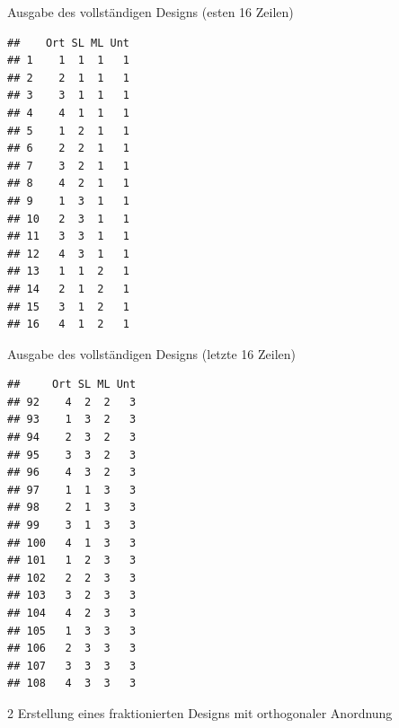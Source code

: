 \documentclass[12pt,ngerman,a4paper,ignorenonframetext,]{beamer}
\newenvironment{Shaded}{\begin{snugshade}}{\end{snugshade}}
\newcommand{\CommentTok}[1]{\textcolor[rgb]{0.56,0.35,0.01}{\textit{#1}}}
\newcommand{\DecValTok}[1]{\textcolor[rgb]{0.00,0.00,0.81}{#1}}
\newcommand{\KeywordTok}[1]{\textcolor[rgb]{0.13,0.29,0.53}{\textbf{#1}}}
\newcommand{\NormalTok}[1]{#1}
\newcommand{\OperatorTok}[1]{\textcolor[rgb]{0.81,0.36,0.00}{\textbf{#1}}}
\newcommand{\StringTok}[1]{\textcolor[rgb]{0.31,0.60,0.02}{#1}}
\begin{document}
\begin{frame}[fragile]{Ausgabe des vollständigen Designs (esten 16
Zeilen)}
\protect\hypertarget{ausgabe-des-vollstandigen-designs-esten-16-zeilen}{}

\begin{verbatim}
##    Ort SL ML Unt
## 1    1  1  1   1
## 2    2  1  1   1
## 3    3  1  1   1
## 4    4  1  1   1
## 5    1  2  1   1
## 6    2  2  1   1
## 7    3  2  1   1
## 8    4  2  1   1
## 9    1  3  1   1
## 10   2  3  1   1
## 11   3  3  1   1
## 12   4  3  1   1
## 13   1  1  2   1
## 14   2  1  2   1
## 15   3  1  2   1
## 16   4  1  2   1
\end{verbatim}

\end{frame}

\begin{frame}[fragile]{Ausgabe des vollständigen Designs (letzte 16
Zeilen)}
\protect\hypertarget{ausgabe-des-vollstandigen-designs-letzte-16-zeilen}{}

\begin{verbatim}
##     Ort SL ML Unt
## 92    4  2  2   3
## 93    1  3  2   3
## 94    2  3  2   3
## 95    3  3  2   3
## 96    4  3  2   3
## 97    1  1  3   3
## 98    2  1  3   3
## 99    3  1  3   3
## 100   4  1  3   3
## 101   1  2  3   3
## 102   2  2  3   3
## 103   3  2  3   3
## 104   4  2  3   3
## 105   1  3  3   3
## 106   2  3  3   3
## 107   3  3  3   3
## 108   4  3  3   3
\end{verbatim}

\end{frame}

\begin{frame}[fragile]{2 Erstellung eines fraktionierten Designs mit
orthogonaler Anordnung}
\protect\hypertarget{erstellung-eines-fraktionierten-designs-mit-orthogonaler-anordnung}{}

\begin{Shaded}
\end{Shaded}

\end{frame}
\end{document}
